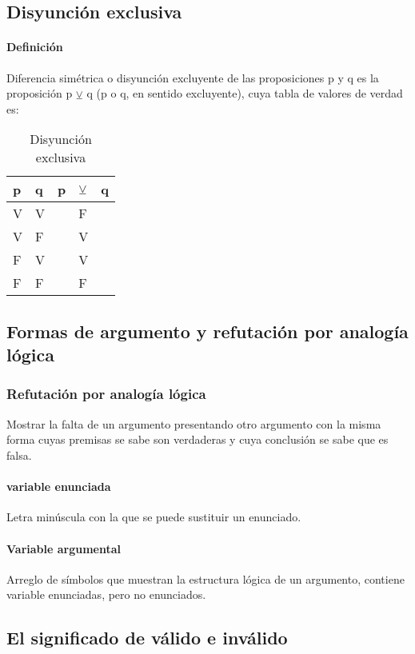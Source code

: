 \documentclass[10pt]{book} 						%
\begin{document}
\subsection{Disyunción exclusiva}
\paragraph{Definición}
Diferencia simétrica o disyunción excluyente de las proposiciones p y q es la proposición p $\veebar$ q (p o q, en sentido excluyente), cuya tabla de valores de verdad es:
\begin{table}[htbp]
  \centering
  \caption{Disyunción exclusiva}
    \begin{tabular}{l|l|rlr}
    p     & q     & \multicolumn{1}{l}{p} & $\veebar$     & \multicolumn{1}{l}{q} \\
    \midrule
    V     & V     &       & F     &  \\
    V     & F     &       & V     &  \\
    F     & V     &       & V     &  \\
    F     & F     &       & F     &  \\
    \end{tabular}%
  \label{tab:addlabel}%
\end{table}%
\subsection{Formas de argumento y refutación por analogía lógica}
\subsubsection{Refutación por analogía lógica}
Mostrar la falta de un argumento presentando otro argumento con la misma forma cuyas premisas se sabe son verdaderas y cuya conclusión se sabe que es falsa.
\paragraph{variable enunciada}
Letra minúscula con la que se puede sustituir un enunciado.
\paragraph{Variable argumental} 
Arreglo de símbolos que muestran la estructura lógica de un argumento, contiene variable enunciadas, pero no enunciados.
\subsection{El significado de válido e inválido}
\end{document}
